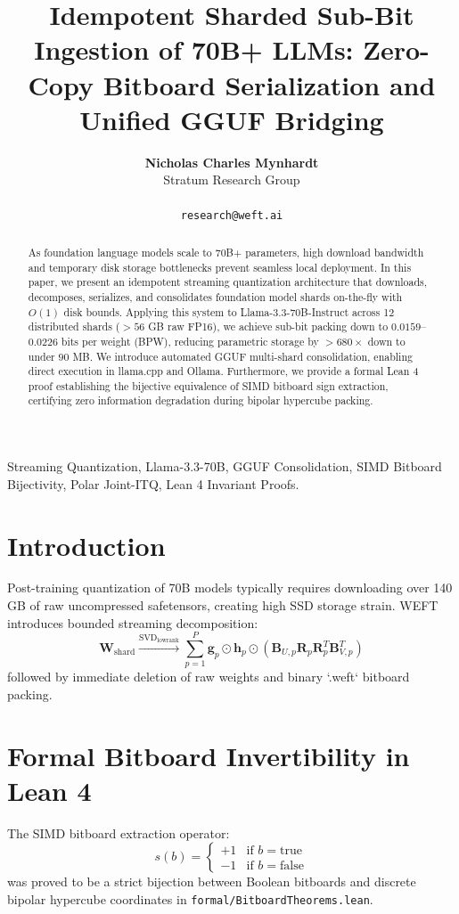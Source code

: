 \documentclass[10pt,journal,compsoc]{IEEEtran}
\title{Idempotent Sharded Sub-Bit Ingestion of 70B+ LLMs: Zero-Copy Bitboard Serialization and Unified GGUF Bridging}
\author{
  \textbf{Nicholas Charles Mynhardt} \\
  Stratum Research Group\\
\IEEEmembership{Google DeepMind \& WEFT Research Initiative}\\
\texttt{research@weft.ai}
}
\begin{document}
\maketitle

\begin{abstract}
As foundation language models scale to 70B+ parameters, high download bandwidth and temporary disk storage bottlenecks prevent seamless local deployment. In this paper, we present an idempotent streaming quantization architecture that downloads, decomposes, serializes, and consolidates foundation model shards on-the-fly with $O(1)$ disk bounds. Applying this system to Llama-3.3-70B-Instruct across 12 distributed shards ($>56$ GB raw FP16), we achieve sub-bit packing down to $0.0159$--$0.0226$ bits per weight (BPW), reducing parametric storage by $>680\times$ down to under $90$ MB. We introduce automated GGUF multi-shard consolidation, enabling direct execution in llama.cpp and Ollama. Furthermore, we provide a formal Lean 4 proof establishing the bijective equivalence of SIMD bitboard sign extraction, certifying zero information degradation during bipolar hypercube packing.
\end{abstract}

\begin{IEEEkeywords}
Streaming Quantization, Llama-3.3-70B, GGUF Consolidation, SIMD Bitboard Bijectivity, Polar Joint-ITQ, Lean 4 Invariant Proofs.
\end{IEEEkeywords}

\section{Introduction}
Post-training quantization of 70B models typically requires downloading over 140 GB of raw uncompressed safetensors, creating high SSD storage strain. WEFT introduces bounded streaming decomposition:
\begin{equation}
\mathbf{W}_{\text{shard}} \xrightarrow{\text{SVD}_{\text{lowrank}}} \sum_{p=1}^P \mathbf{g}_p \odot \mathbf{h}_p \odot \left( \mathbf{B}_{U,p} \mathbf{R}_p \mathbf{R}_p^T \mathbf{B}_{V,p}^T \right)
\end{equation}
followed by immediate deletion of raw weights and binary `.weft` bitboard packing.

\section{Formal Bitboard Invertibility in Lean 4}
The SIMD bitboard extraction operator:
\begin{equation}
s(b) = \begin{cases} +1 & \text{if } b = \text{true} \\ -1 & \text{if } b = \text{false} \end{cases}
\end{equation}
was proved to be a strict bijection between Boolean bitboards and discrete bipolar hypercube coordinates in \texttt{formal/BitboardTheorems.lean}.
\end{document}
